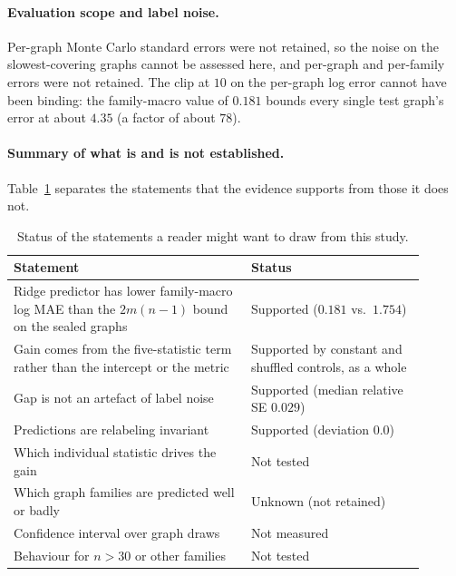 \documentclass{article}
\begin{document}
\paragraph{Evaluation scope and label noise.} Per-graph Monte Carlo standard errors were not retained, so the noise on the slowest-covering graphs cannot be assessed here, and per-graph and per-family errors were not retained. The clip at $10$ on the per-graph log error cannot have been binding: the family-macro value of $0.181$ bounds every single test graph's error at about $4.35$ (a factor of about $78$).

\paragraph{Summary of what is and is not established.} Table~\ref{tab:status} separates the statements that the evidence supports from those it does not.

\begin{table}[t]
\centering
\caption{Status of the statements a reader might want to draw from this study.}
\label{tab:status}
\small
\begin{tabular}{p{0.52\linewidth}p{0.38\linewidth}}
\toprule
Statement & Status \\
\midrule
Ridge predictor has lower family-macro log MAE than the $2m(n-1)$ bound on the sealed graphs & Supported ($0.181$ vs.\ $1.754$) \\
Gain comes from the five-statistic term rather than the intercept or the metric & Supported by constant and shuffled controls, as a whole \\
Gap is not an artefact of label noise & Supported (median relative SE $0.029$) \\
Predictions are relabeling invariant & Supported (deviation $0.0$) \\
Which individual statistic drives the gain & Not tested \\
Which graph families are predicted well or badly & Unknown (not retained) \\
Confidence interval over graph draws & Not measured \\
Behaviour for $n>30$ or other families & Not tested \\
\bottomrule
\end{tabular}
\end{table}
\end{document}
